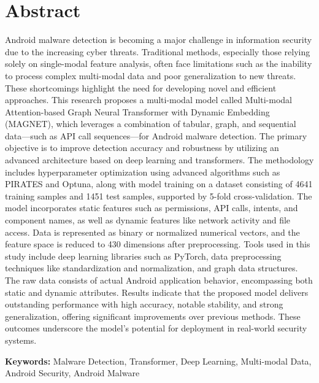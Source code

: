 \chapter*{\vspace{-3cm}\fontsize{14}{15}\selectfont Abstract}
\thispagestyle{empty}
\vspace{-1.5cm}\setlength{\parindent}{20pt}\fontsize{12}{13}\selectfont
Android malware detection is becoming a major challenge in information security due to the increasing cyber threats. Traditional methods, especially those relying solely on single-modal feature analysis, often face limitations such as the inability to process complex multi-modal data and poor generalization to new threats. These shortcomings highlight the need for developing novel and efficient approaches. This research proposes a multi-modal model called Multi-modal Attention-based Graph Neural Transformer with Dynamic Embedding (MAGNET), which leverages a combination of tabular, graph, and sequential data—such as API call sequences—for Android malware detection. The primary objective is to improve detection accuracy and robustness by utilizing an advanced architecture based on deep learning and transformers. The methodology includes hyperparameter optimization using advanced algorithms such as PIRATES and Optuna, along with model training on a dataset consisting of 4641 training samples and 1451 test samples, supported by 5-fold cross-validation. The model incorporates static features such as permissions, API calls, intents, and component names, as well as dynamic features like network activity and file access. Data is represented as binary or normalized numerical vectors, and the feature space is reduced to 430 dimensions after preprocessing. Tools used in this study include deep learning libraries such as PyTorch, data preprocessing techniques like standardization and normalization, and graph data structures. The raw data consists of actual Android application behavior, encompassing both static and dynamic attributes. Results indicate that the proposed model delivers outstanding performance with high accuracy, notable stability, and strong generalization, offering significant improvements over previous methods. These outcomes underscore the model's potential for deployment in real-world security systems.

\par\vspace{.5cm}\setlength{\parindent}{0pt}
\textbf{Keywords:} Malware Detection, Transformer, Deep Learning, Multi-modal Data, Android Security, Android Malware
